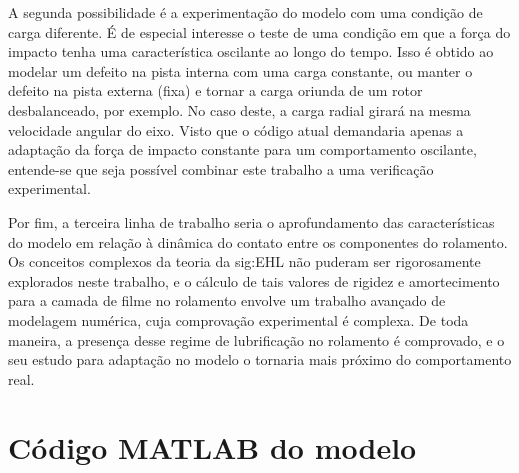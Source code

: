 \documentclass[12pt,oneside,english,brazil,lmodern,siglas,simbolos,cite=num]{ucsmonograph}
\begin{document}
	A segunda possibilidade é a experimentação do modelo com uma condição de carga diferente.
	É de especial interesse o teste de uma condição em que a força do impacto tenha uma característica oscilante ao longo do tempo.
	Isso é obtido ao modelar um defeito na pista interna com uma carga constante, ou manter o defeito na pista externa (fixa) e tornar a carga oriunda de um rotor desbalanceado, por exemplo.
	No caso deste, a carga radial girará na mesma velocidade angular do eixo.
	Visto que o código atual demandaria apenas a adaptação da força de impacto constante para um comportamento oscilante, entende-se que seja possível combinar este trabalho a uma verificação experimental.
	
	Por fim, a terceira linha de trabalho seria o aprofundamento das características do modelo em relação à dinâmica do contato entre os componentes do rolamento.
	Os conceitos complexos da teoria da \gls{sig:EHL} não puderam ser rigorosamente explorados neste trabalho, e o cálculo de tais valores de rigidez e amortecimento para a camada de filme no rolamento envolve um trabalho avançado de modelagem numérica, cuja comprovação experimental é complexa.
	De toda maneira, a presença desse regime de lubrificação no rolamento é comprovado, e o seu estudo para adaptação no modelo o tornaria mais próximo do comportamento real.
	
	\postextual
	
	
	
	\apendices
	\chapter{Código MATLAB do modelo} \label{apc:codigo}
	
	
	
	
	
	
	
	
	
\end{document}
